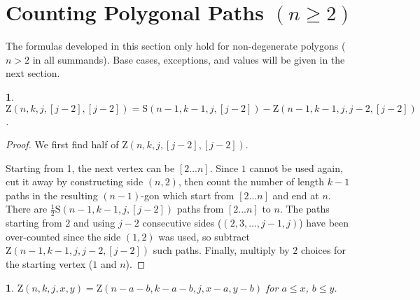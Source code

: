 \documentclass[a4paper, 12pt] {article}
\theoremstyle{remark}
\theoremstyle{plain}
\newcommand{\thistheoremname}{}
\newtheorem{genericthm}[theorem]{\thistheoremname}
\newenvironment{namedthm}[1]
  {\renewcommand{\thistheoremname}{#1}
   \begin{genericthm}}
  {\end{genericthm}}
\theoremstyle{remark}
\begin{document}
\begin{comment}
${\stackrel{x \rightarrow y}{\mathbb{Z}}}_{\hspace{-0.175cm} j} (n, k)$

$\stackrel{x \rightarrow y \ }{\mathbb{Z}_{j}} \hspace{-0.275cm} (n, k)$

\hspace{0.03cm} $\mathbb{Z}_{j}(n, k)$

\hspace{-0.05cm} ${\stackrel{x \_ y}{\mathbb{O}}}_{\hspace{-0.075cm} j} (n, k)$
\end{comment}



\section{Counting Polygonal Paths $(n \geq 2)$}
\label{CPP}
The formulas developed in this section only hold for non-degenerate polygons ($n > 2$ in all summands). Base cases, exceptions, and values will be given in the next section.

\begin{namedthm}{Vertex Removal Theorem Z}
\label{vertex_removal_z}
$\mathrm{Z}(n,k,j,[j-2],[j-2])=\mathrm{S}(n-1,k-1,j,[j-2])-\mathrm{Z}(n-1,k-1,j,j-2,[j-2])$.
\end{namedthm}

\begin{proof}
We first find half of $\mathrm{Z}(n,k,j,[j-2],[j-2])$.

Starting from 1, the next vertex can be $[2...n]$. Since $1$ cannot be used again, cut it away by constructing side $(n,2)$, then count the number of length $k-1$ paths in the resulting $(n-1)$-gon which start from $[2...n]$ and end at $n$. There are $\frac{1}{2}\mathrm{S}(n-1,k-1,j,[j-2])$ paths from $[2...n]$ to $n$. The paths starting from $2$ and using $j-2$ consecutive sides ($(2,3,...,j-1,j)$) have been over-counted since the side $(1,2)$ was used, so subtract $\mathrm{Z}(n-1,k-1,j,j-2,[j-2])$ such paths. Finally, multiply by $2$ choices for the starting vertex ($1$ and $n$).
\end{proof}


\begin{namedthm}{Side Removal Theorem Z}
\label{side_removal_z}
$\mathrm{Z}(n,k,j,x,y)=\mathrm{Z}(n-a-b,k-a-b,j,x-a,y-b)$ for $a \leq x$, $b \leq y$.
\end{namedthm}
\end{document}
